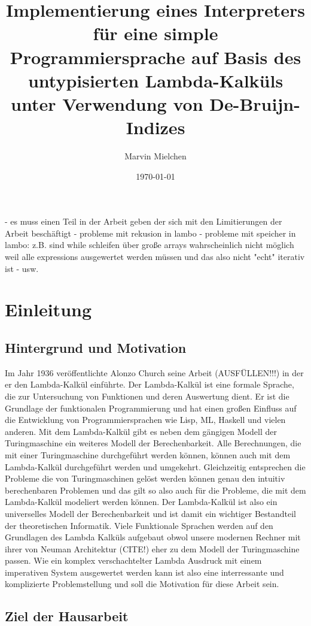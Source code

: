 \documentclass{article}
\title{Implementierung eines Interpreters für eine simple Programmiersprache auf Basis des untypisierten Lambda-Kalküls unter Verwendung von De-Bruijn-Indizes}
\author{Marvin Mielchen}
\date{\today}
\begin{document}
\maketitle

- es muss einen Teil in der Arbeit geben der sich mit den Limitierungen der Arbeit beschäftigt
    - probleme mit rekusion in lambo
    - probleme mit speicher in lambo: z.B. sind while schleifen über große arrays wahrscheinlich nicht möglich weil alle expressions ausgewertet werden müssen und
    das also nicht "echt" iterativ ist
    - usw.

\section{Einleitung}

\subsection{Hintergrund und Motivation}

Im Jahr 1936 veröffentlichte Alonzo Church seine Arbeit (AUSFÜLLEN!!!) in der er den Lambda-Kalkül einführte. 
Der Lambda-Kalkül ist eine formale Sprache, die zur Untersuchung von Funktionen und deren Auswertung dient. Er ist die Grundlage der funktionalen Programmierung und hat einen großen Einfluss auf die Entwicklung von Programmiersprachen wie Lisp, ML, Haskell und vielen anderen.
Mit dem Lambda-Kalkül gibt es neben dem gängigen Modell der Turingmaschine ein weiteres Modell der Berechenbarkeit. Alle Berechnungen, die mit einer Turingmaschine durchgeführt werden können, können auch mit dem Lambda-Kalkül durchgeführt werden und umgekehrt.
Gleichzeitig entsprechen die Probleme die von Turingmaschinen gelöst werden können genau den intuitiv berechenbaren Problemen und das gilt so also auch für die Probleme, die mit dem Lambda-Kalkül modeliert werden können.
Der Lambda-Kalkül ist also ein universelles Modell der Berechenbarkeit und ist damit ein wichtiger Bestandteil der theoretischen Informatik. Viele Funktionale Sprachen werden auf den Grundlagen des Lambda Kalküls aufgebaut obwol unsere modernen Rechner mit ihrer von Neuman Architektur (CITE!) eher zu dem Modell der Turingmaschine passen.
Wie ein komplex verschachtelter Lambda Ausdruck mit einem imperativen System ausgewertet werden kann ist also eine interressante und komplizierte Problemstellung und soll die Motivation für diese Arbeit sein.

\subsection{Ziel der Hausarbeit}
\end{document}
